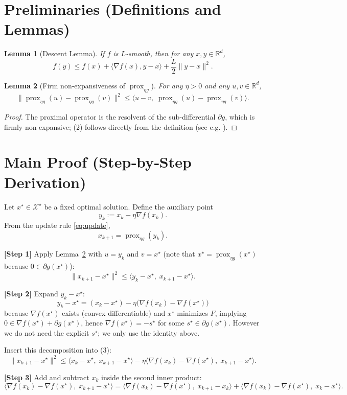 \documentclass{article}
\newtheorem{lemma}{Lemma}
\newcommand{\prox}{\operatorname{prox}}
\begin{document}
\section*{Preliminaries (Definitions and Lemmas)}
\begin{lemma}[Descent Lemma]\label{lem:descent}
If $f$ is $L$‑smooth, then for any $x,y\in\mathbb{R}^d$,
\[
f(y)\le f(x)+\langle \nabla f(x),y-x\rangle+\frac{L}{2}\|y-x\|^2 .
\]
\end{lemma}
\begin{lemma}[Firm non‑expansiveness of $\prox_{\eta g}$]\label{lem:nonexp}
For any $\eta>0$ and any $u,v\in\mathbb{R}^d$,
\[
\|\prox_{\eta g}(u)-\prox_{\eta g}(v)\|^2
\le \langle u-v,\;\prox_{\eta g}(u)-\prox_{\eta g}(v)\rangle .
\tag{2}
\]
\end{lemma}
\begin{proof}
The proximal operator is the resolvent of the sub‑differential $\partial g$, which is firmly non‑expansive; (2) follows directly from the definition (see e.g. \cite{Parikh2014}).
\end{proof}

\section*{Main Proof (Step‑by‑Step Derivation)}
Let $x^\star\in\mathcal{X}^\star$ be a fixed optimal solution. Define the auxiliary point
\[
y_k := x_k-\eta\nabla f(x_k).
\]
From the update rule \eqref{eq:update},
\[
x_{k+1}= \prox_{\eta g}(y_k).
\]

\noindent\textbf{[Step 1]} Apply Lemma~\ref{lem:nonexp} with $u=y_k$ and $v=x^\star$ (note that $x^\star=\prox_{\eta g}(x^\star)$ because $0\in\partial g(x^\star)$):
\[
\|x_{k+1}-x^\star\|^2
\le \langle y_k-x^\star,\;x_{k+1}-x^\star\rangle .
\tag{3}
\]

\noindent\textbf{[Step 2]} Expand $y_k-x^\star$:
\[
y_k-x^\star = (x_k-x^\star)-\eta\bigl(\nabla f(x_k)-\nabla f(x^\star)\bigr)
\]
because $\nabla f(x^\star)$ exists (convex differentiable) and $x^\star$ minimizes $F$, implying $0\in \nabla f(x^\star)+\partial g(x^\star)$, hence $\nabla f(x^\star) = -s^\star$ for some $s^\star\in\partial g(x^\star)$. However we do not need the explicit $s^\star$; we only use the identity above.

Insert this decomposition into (3):
\[
\|x_{k+1}-x^\star\|^2
\le \langle x_k-x^\star,\;x_{k+1}-x^\star\rangle
-\eta\langle \nabla f(x_k)-\nabla f(x^\star),\;x_{k+1}-x^\star\rangle .
\tag{4}
\]

\noindent\textbf{[Step 3]} Add and subtract $x_k$ inside the second inner product:
\[
\langle \nabla f(x_k)-\nabla f(x^\star),\;x_{k+1}-x^\star\rangle
=
\langle \nabla f(x_k)-\nabla f(x^\star),\;x_{k+1}-x_k\rangle
+
\langle \nabla f(x_k)-\nabla f(x^\star),\;x_k-x^\star\rangle .
\tag{5}
\]
\end{document}
